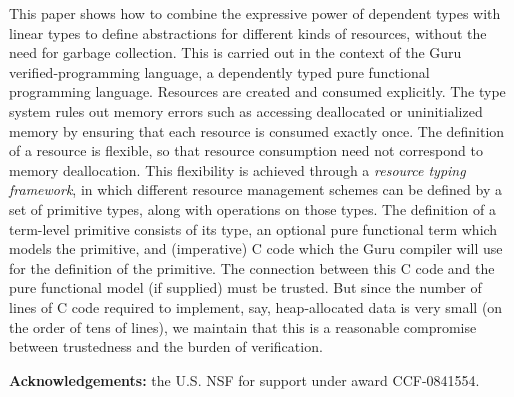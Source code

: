 \documentclass[9pt,natbib]{sigplanconf}
\begin{document}
This paper shows how to combine the expressive power of dependent
types with linear types to define abstractions for different kinds of
resources, without the need for garbage collection.  This is carried
out in the context of the Guru verified-programming language, a
dependently typed pure functional programming language.  Resources are
created and consumed explicitly.  The type system rules out memory
errors such as accessing deallocated or uninitialized memory by
ensuring that each resource is consumed exactly once.  The definition
of a resource is flexible, so that resource consumption need not
correspond to memory deallocation.  This flexibility is achieved
through a \emph{resource typing framework}, in which different
resource management schemes can be defined by a set of primitive
types, along with operations on those types.  The definition of a
term-level primitive consists of its type, an optional pure functional
term which models the primitive, and (imperative) C code which the
Guru compiler will use for the definition of the primitive.  The
connection between this C code and the pure functional model (if
supplied) must be trusted.  But since the number of lines of C code
required to implement, say, heap-allocated data is very small (on the
order of tens of lines), we maintain that this is a reasonable
compromise between trustedness and the burden of verification.

\textbf{Acknowledgements:} the U.S. NSF for support under award CCF-0841554.




\end{document}
